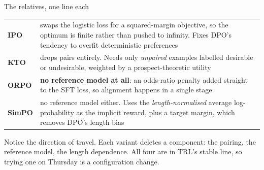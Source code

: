 \documentclass[aspectratio=169,10pt]{beamer}
\begin{document}
\begin{frame}[shrink=13]{The relatives, one line each}
  \centering
  \begin{tabular}{@{}L{2.0cm} L{9.1cm}@{}}
    \toprule
    \textbf{IPO} & swaps the logistic loss for a squared-margin objective, so
      the optimum is finite rather than pushed to infinity. Fixes DPO's
      tendency to overfit deterministic preferences\\[0.35em]
    \textbf{KTO} & drops pairs entirely. Needs only \emph{unpaired} examples
      labelled desirable or undesirable, weighted by a prospect-theoretic
      utility \\[0.35em]
    \textbf{ORPO} & \textbf{no reference model at all}: an odds-ratio penalty
      added straight to the SFT loss, so alignment happens in a single stage
      \\[0.35em]
    \textbf{SimPO} & no reference model either. Uses the
      \emph{length-normalised} average log-probability as the implicit reward,
      plus a target margin, which removes DPO's length bias
      \\
    \bottomrule
  \end{tabular}

  \vspace{0.5em}
  \raggedright
  \small
  Notice the direction of travel. Each variant deletes a component: the
  pairing, the reference model, the length dependence. All four are in TRL's
  stable line, so trying one on Thursday is a configuration change.
\end{frame}
\fi
\end{document}
